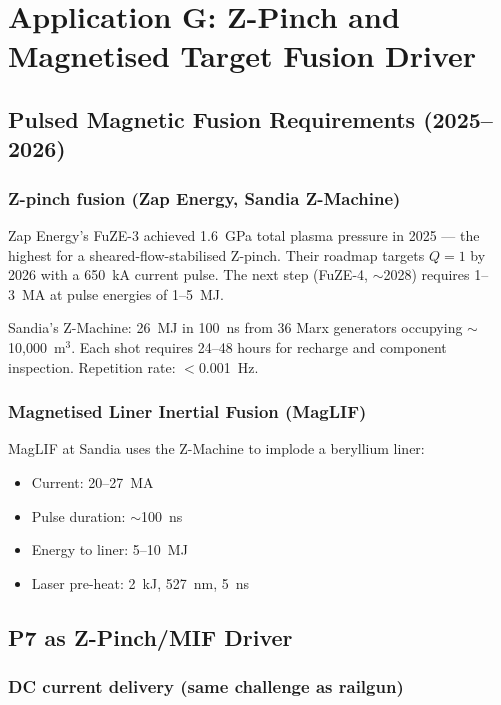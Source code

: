 \documentclass[11pt]{article}
\begin{document}
\section{Application G: Z-Pinch and Magnetised Target Fusion Driver}
\label{sec:zpinch}

\subsection{Pulsed Magnetic Fusion Requirements (2025--2026)}

\subsubsection{Z-pinch fusion (Zap Energy, Sandia Z-Machine)}

Zap Energy's FuZE-3 achieved 1.6~GPa total plasma pressure in 2025 ---
the highest for a sheared-flow-stabilised Z-pinch. Their roadmap targets
$Q = 1$ by 2026 with a 650~kA current pulse. The next step (FuZE-4,
$\sim$2028) requires 1--3~MA at pulse energies of 1--5~MJ.

Sandia's Z-Machine: 26~MJ in 100~ns from 36 Marx generators occupying
$\sim$10,000~m$^3$. Each shot requires 24--48 hours for recharge and
component inspection. Repetition rate: $<$0.001~Hz.

\subsubsection{Magnetised Liner Inertial Fusion (MagLIF)}

MagLIF at Sandia uses the Z-Machine to implode a beryllium liner:
\begin{itemize}[nosep]
  \item Current: 20--27~MA
  \item Pulse duration: $\sim$100~ns
  \item Energy to liner: 5--10~MJ
  \item Laser pre-heat: 2~kJ, 527~nm, 5~ns
\end{itemize}

\subsection{P7 as Z-Pinch/MIF Driver}

\subsubsection{DC current delivery (same challenge as railgun)}
\end{document}
